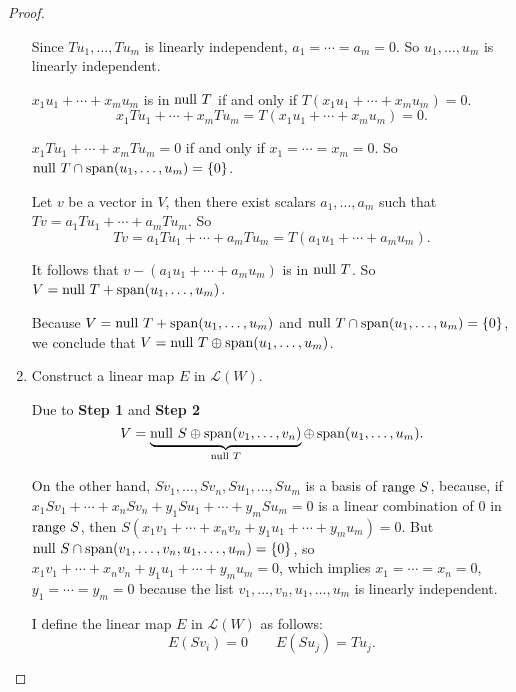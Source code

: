 \begin{proof}
\begin{enumerate}[label={\textbf{Step \arabic*.}},itemindent={1cm}]
              Since $Tu_{1}, \ldots, Tu_{m}$ is linearly independent, $a_{1} = \cdots = a_{m} = 0$. So $u_{1}, \ldots, u_{m}$ is linearly independent.

              $x_{1}u_{1} + \cdots + x_{m}u_{m}$ is in $\operatorname{null}\,{T}$ if and only if $T(x_{1}u_{1} + \cdots + x_{m}u_{m}) = 0$.
              \[
                  x_{1}Tu_{1} + \cdots + x_{m}Tu_{m} = T(x_{1}u_{1} + \cdots + x_{m}u_{m}) = 0.
              \]

              $x_{1}Tu_{1} + \cdots + x_{m}Tu_{m} = 0$ if and only if $x_{1} = \cdots = x_{m} = 0$. So $\operatorname{null}\,{T}\cap\operatorname{span}(u_{1}, \ldots, u_{m}) = \{0\}$.

              Let $v$ be a vector in $V$, then there exist scalars $a_{1}, \ldots, a_{m}$ such that $Tv = a_{1}Tu_{1} + \cdots + a_{m}Tu_{m}$. So
              \[
                  Tv = a_{1}Tu_{1} + \cdots + a_{m}Tu_{m} = T(a_{1}u_{1} + \cdots + a_{m}u_{m}).
              \]

              It follows that $v - (a_{1}u_{1} + \cdots + a_{m}u_{m})$ is in $\operatorname{null}\,{T}$. So $V = \operatorname{null}\,{T} + \operatorname{span}(u_{1}, \ldots, u_{m})$.

              Because $V = \operatorname{null}\,{T} + \operatorname{span}(u_{1}, \ldots, u_{m})$ and $\operatorname{null}\,{T}\cap \operatorname{span}(u_{1}, \ldots, u_{m}) = \{0\}$, we conclude that $V = \operatorname{null}\,{T}\oplus \operatorname{span}(u_{1}, \ldots, u_{m})$.
        \item Construct a linear map $E$ in $\mathcal{L}(W)$.

              Due to \textbf{Step 1} and \textbf{Step 2}
              \[
                  V = \underbrace{\operatorname{null}\,{S} \oplus \operatorname{span}(v_{1}, \ldots, v_{n})}_{\operatorname{null}\,{T}} \oplus \operatorname{span}(u_{1}, \ldots, u_{m}).
              \]

              On the other hand, $Sv_{1}, \ldots, Sv_{n}, Su_{1}, \ldots, Su_{m}$ is a basis of $\operatorname{range}\,{S}$, because, if $x_{1}Sv_{1} + \cdots + x_{n}Sv_{n} + y_{1}Su_{1} + \cdots + y_{m}Su_{m} = 0$ is a linear combination of $0$ in $\operatorname{range}\,{S}$, then $S(x_{1}v_{1} + \cdots + x_{n}v_{n} + y_{1}u_{1} + \cdots + y_{m}u_{m}) = 0$. But $\operatorname{null}\,{S}\cap \operatorname{span}(v_{1}, \ldots, v_{n}, u_{1}, \ldots, u_{m}) = \{0\}$, so $x_{1}v_{1} + \cdots + x_{n}v_{n} + y_{1}u_{1} + \cdots + y_{m}u_{m} = 0$, which implies $x_{1} = \cdots = x_{n} = 0$, $y_{1} = \cdots = y_{m} = 0$ because the list $v_{1}, \ldots, v_{n}, u_{1}, \ldots, u_{m}$ is linearly independent.

              I define the linear map $E$ in $\mathcal{L}(W)$ as follows:
              \[
                  E(Sv_{i}) = 0\qquad E(Su_{j}) = Tu_{j}.
              \]


\end{enumerate}
\end{proof}
